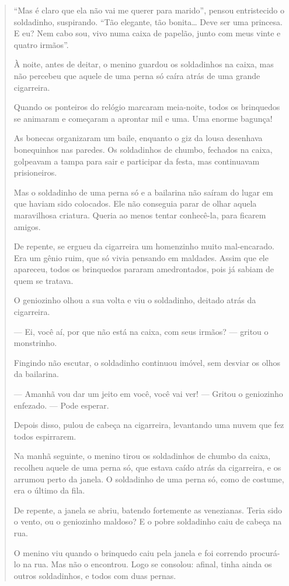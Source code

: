 \begin{conteudo}
\begin{conteudo}
\begin{conteudo}
\begin{conteudo}
\begin{quote}
``Mas é claro que ela não vai me querer para marido'', pensou
entristecido o soldadinho, suspirando. ``Tão elegante, tão
bonita\ldots{} Deve ser uma princesa. E eu? Nem cabo sou, vivo numa
caixa de papelão, junto com meus vinte e quatro
irmãos''.

À noite, antes de deitar, o menino guardou os soldadinhos na caixa, mas
não percebeu que aquele de uma perna só caíra atrás de uma grande
cigarreira.

Quando os ponteiros do relógio marcaram meia-noite, todos os brinquedos
se animaram e começaram a aprontar mil e uma. Uma enorme bagunça!

As bonecas organizaram um baile, enquanto o giz da lousa desenhava
bonequinhos nas paredes. Os soldadinhos de chumbo, fechados na caixa,
golpeavam a tampa para sair e participar da festa, mas continuavam
prisioneiros.

Mas o soldadinho de uma perna só e a bailarina não saíram do lugar em
que haviam sido colocados. Ele não conseguia parar de olhar aquela
maravilhosa criatura. Queria ao menos tentar conhecê-la, para ficarem
amigos.

De repente, se ergueu da cigarreira um homenzinho muito mal-encarado.
Era um gênio ruim, que só vivia pensando em maldades. Assim que ele
apareceu, todos os brinquedos pararam amedrontados, pois já sabiam de
quem se tratava.

O geniozinho olhou a sua volta e viu o soldadinho, deitado atrás da
cigarreira.

--- Ei, você aí, por que não está na caixa, com seus irmãos? --- gritou
o monstrinho.

Fingindo não escutar, o soldadinho continuou imóvel, sem desviar os
olhos da bailarina.

--- Amanhã vou dar um jeito em você, você vai ver! --- Gritou o geniozinho
enfezado. --- Pode esperar.

Depois disso, pulou de cabeça na cigarreira, levantando uma nuvem que
fez todos espirrarem.

Na manhã seguinte, o menino tirou os soldadinhos de chumbo da caixa,
recolheu aquele de uma perna só, que estava caído atrás da cigarreira, e
os arrumou perto da janela. O soldadinho de uma perna só, como de
costume, era o último da fila.

De repente, a janela se abriu, batendo fortemente as venezianas. Teria
sido o vento, ou o geniozinho maldoso? E o pobre soldadinho caiu de
cabeça na rua.

O menino viu quando o brinquedo caiu pela janela e foi correndo
procurá-lo na rua. Mas não o encontrou. Logo se consolou: afinal, tinha
ainda os outros soldadinhos, e todos com duas pernas.


\end{quote}
\end{conteudo}
\end{conteudo}
\end{conteudo}
\end{conteudo}
